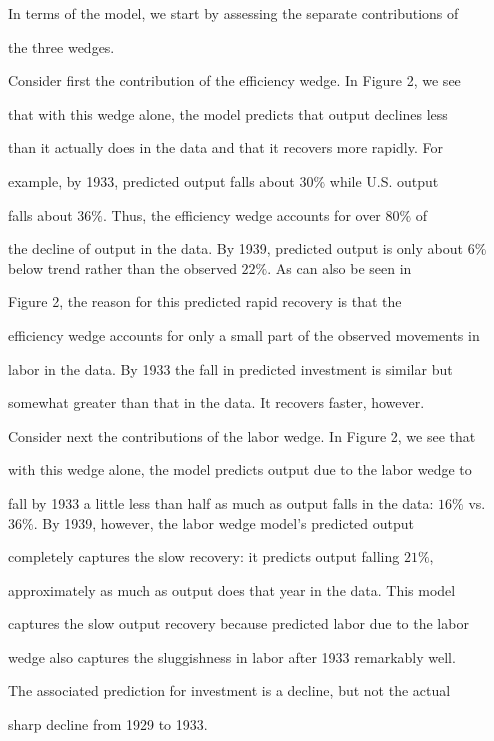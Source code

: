 \documentclass[fleqn,leqno,11pt]{article}
\begin{document}
In terms of the model, we start by assessing the separate contributions of

the three wedges.



Consider first the contribution of the efficiency wedge. In Figure 2, we see

that with this wedge alone, the model predicts that output declines less

than it actually does in the data and that it recovers more rapidly. For

example, by 1933, predicted output falls about $30\%$ while U.S. output

falls about $36\%$. Thus, the efficiency wedge accounts for over $80\%$ of

the decline of output in the data. By 1939, predicted output is only about $%

6\%$ below trend rather than the observed $22\%.$ As can also be seen in

Figure 2, the reason for this predicted rapid recovery is that the

efficiency wedge accounts for only a small part of the observed movements in

labor in the data. By 1933 the fall in predicted investment is similar but

somewhat greater than that in the data. It recovers faster, however.



Consider next the contributions of the labor wedge. In Figure 2, we see that

with this wedge alone, the model predicts output due to the labor wedge to

fall by 1933 a little less than half as much as output falls in the data: $%

16\%$ vs. $36\%.$ By 1939, however, the labor wedge model's predicted output

completely captures the slow recovery: it predicts output falling $21\%$,

approximately as much as output does that year in the data. This model

captures the slow output recovery because predicted labor due to the labor

wedge also captures the sluggishness in labor after 1933 remarkably well.

The associated prediction for investment is a decline, but not the actual

sharp decline from 1929 to 1933.
\end{document}
